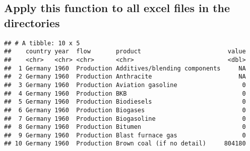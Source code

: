 \documentclass[
]{article}
\newenvironment{Shaded}{\begin{snugshade}}{\end{snugshade}}
\newcommand{\CommentTok}[1]{\textcolor[rgb]{0.56,0.35,0.01}{\textit{#1}}}
\newcommand{\ControlFlowTok}[1]{\textcolor[rgb]{0.13,0.29,0.53}{\textbf{#1}}}
\newcommand{\DecValTok}[1]{\textcolor[rgb]{0.00,0.00,0.81}{#1}}
\newcommand{\KeywordTok}[1]{\textcolor[rgb]{0.13,0.29,0.53}{\textbf{#1}}}
\newcommand{\NormalTok}[1]{#1}
\newcommand{\OperatorTok}[1]{\textcolor[rgb]{0.81,0.36,0.00}{\textbf{#1}}}
\newcommand{\StringTok}[1]{\textcolor[rgb]{0.31,0.60,0.02}{#1}}
\begin{document}
\hypertarget{apply-this-function-to-all-excel-files-in-the-directories}{%
\subsection{Apply this function to all excel files in the
directories}\label{apply-this-function-to-all-excel-files-in-the-directories}}

\begin{Shaded}
\end{Shaded}

\begin{verbatim}
## # A tibble: 10 x 5
##    country year  flow       product                        value
##    <chr>   <chr> <chr>      <chr>                          <dbl>
##  1 Germany 1960  Production Additives/blending components     NA
##  2 Germany 1960  Production Anthracite                        NA
##  3 Germany 1960  Production Aviation gasoline                  0
##  4 Germany 1960  Production BKB                                0
##  5 Germany 1960  Production Biodiesels                         0
##  6 Germany 1960  Production Biogases                           0
##  7 Germany 1960  Production Biogasoline                        0
##  8 Germany 1960  Production Bitumen                            0
##  9 Germany 1960  Production Blast furnace gas                  0
## 10 Germany 1960  Production Brown coal (if no detail)     804180
\end{verbatim}
\end{document}
